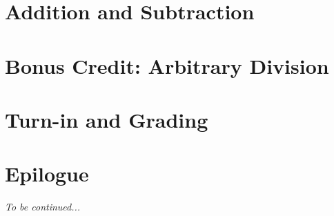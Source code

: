 \documentclass[12pt]{article}
\begin{document}
    \section{Addition and Subtraction}                                  

    \section{Bonus Credit: Arbitrary Division}                          

    \section{Turn-in and Grading}                                       

    \section*{Epilogue}                                                 \scenariowrapup

    \textit{To be continued...}
\end{document}
